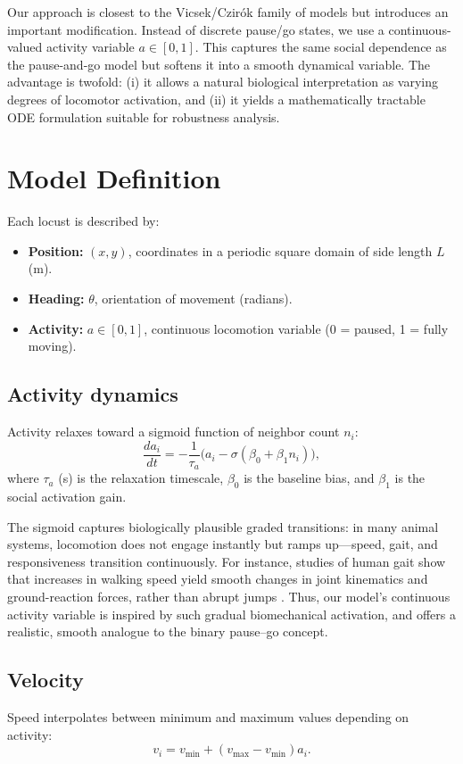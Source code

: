 \documentclass[11pt,a4paper]{article}
\begin{document}
Our approach is closest to the Vicsek/Czirók family of models but introduces an important modification. Instead of discrete pause/go states, we use a continuous-valued activity variable $a \in [0,1]$. This captures the same social dependence as the pause-and-go model but softens it into a smooth dynamical variable. The advantage is twofold: (i) it allows a natural biological interpretation as varying degrees of locomotor activation, and (ii) it yields a mathematically tractable ODE formulation suitable for robustness analysis.

\section{Model Definition}

Each locust is described by:
\begin{itemize}
    \item \textbf{Position:} $(x,y)$, coordinates in a periodic square domain of side length $L$ (m).
    \item \textbf{Heading:} $\theta$, orientation of movement (radians).
    \item \textbf{Activity:} $a \in [0,1]$, continuous locomotion variable (0 = paused, 1 = fully moving).
\end{itemize}

\subsection{Activity dynamics}
Activity relaxes toward a sigmoid function of neighbor count $n_i$:
\[
\frac{da_i}{dt} = -\frac{1}{\tau_a}\Big(a_i - \sigma(\beta_0 + \beta_1 n_i)\Big),
\]
where $\tau_a$ (s) is the relaxation timescale, $\beta_0$ is the baseline bias, and $\beta_1$ is the social activation gain.

The sigmoid captures biologically plausible graded transitions: in many animal systems, locomotion does not engage instantly but ramps up—speed, gait, and responsiveness transition continuously. For instance, studies of human gait show that increases in walking speed yield smooth changes in joint kinematics and ground-reaction forces, rather than abrupt jumps \cite{fukuchi2019gait}. Thus, our model's continuous activity variable is inspired by such gradual biomechanical activation, and offers a realistic, smooth analogue to the binary pause–go concept.


\subsection{Velocity}
Speed interpolates between minimum and maximum values depending on activity:
\[
v_i = v_{\min} + (v_{\max} - v_{\min}) a_i.
\]
\end{document}
